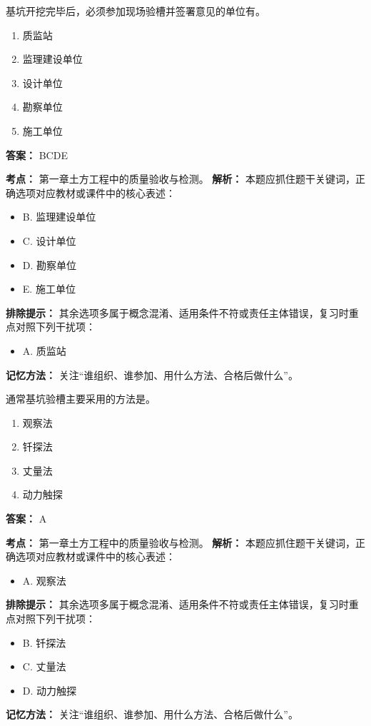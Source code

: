 \documentclass[UTF8,fontset=fandol,11pt]{ctexart}
\begin{document}
\begin{quizbox}[title={第 25 题}]
基坑开挖完毕后，必须参加现场验槽并签署意见的单位有。\\
\begin{enumerate}[label=\Alph*.]
\item 质监站
\item 监理建设单位
\item 设计单位
\item 勘察单位
\item 施工单位
\end{enumerate}
\textbf{答案：} BCDE
\vspace{0.25em}
\begin{answerbox}[title={考点解析}]
\textbf{考点：} 第一章土方工程中的质量验收与检测。
\textbf{解析：} 本题应抓住题干关键词，正确选项对应教材或课件中的核心表述：
\begin{itemize}
\item B. 监理建设单位
\item C. 设计单位
\item D. 勘察单位
\item E. 施工单位
\end{itemize}
\textbf{排除提示：} 其余选项多属于概念混淆、适用条件不符或责任主体错误，复习时重点对照下列干扰项：
\begin{itemize}
\item A. 质监站
\end{itemize}
\textbf{记忆方法：} 关注“谁组织、谁参加、用什么方法、合格后做什么”。
\end{answerbox}
\end{quizbox}

\vspace{0.2em}

\begin{quizbox}[title={第 26 题}]
通常基坑验槽主要采用的方法是。\\
\begin{enumerate}[label=\Alph*.]
\item 观察法
\item 钎探法
\item 丈量法
\item 动力触探
\end{enumerate}
\textbf{答案：} A
\vspace{0.25em}
\begin{answerbox}[title={考点解析}]
\textbf{考点：} 第一章土方工程中的质量验收与检测。
\textbf{解析：} 本题应抓住题干关键词，正确选项对应教材或课件中的核心表述：
\begin{itemize}
\item A. 观察法
\end{itemize}
\textbf{排除提示：} 其余选项多属于概念混淆、适用条件不符或责任主体错误，复习时重点对照下列干扰项：
\begin{itemize}
\item B. 钎探法
\item C. 丈量法
\item D. 动力触探
\end{itemize}
\textbf{记忆方法：} 关注“谁组织、谁参加、用什么方法、合格后做什么”。
\end{answerbox}
\end{quizbox}
\end{document}
